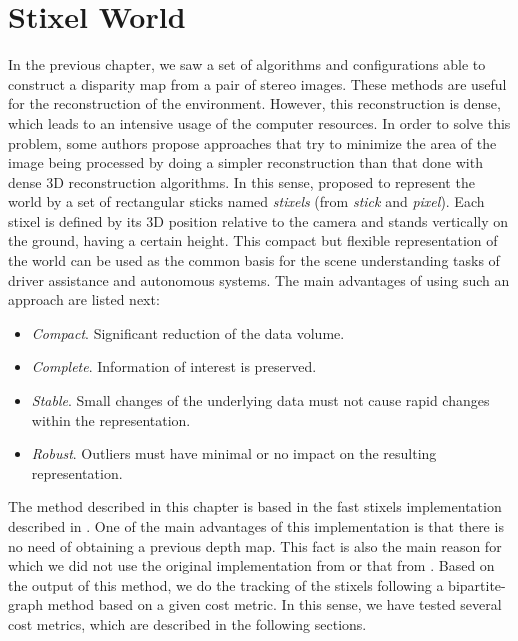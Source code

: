\graphicspath{{./images/chapter04/bmps/}{./images/chapter04/vects/}{./images/chapter04/}}

\chapter{Stixel World}\label{ch:chapter04}

In the previous chapter, we saw a set of algorithms and configurations able to construct a disparity map from a pair of stereo images. These methods are useful for the reconstruction of the environment. However, this reconstruction is dense, which leads to an intensive usage of the computer resources. In order to solve this problem, some authors propose approaches that try to minimize the area of the image being processed by doing a simpler reconstruction than that done with dense 3D reconstruction algorithms. In this sense, \cite{badino2009stixel} proposed to represent the world by a set of rectangular sticks named \emph{stixels} (from \emph{stick} and \emph{pixel}). Each stixel is defined by its 3D position relative to the camera and stands vertically on the ground, having a certain height.
This compact but flexible representation of the world can be used as the common basis for the scene understanding tasks of driver assistance and autonomous systems. The main advantages of using such an approach are listed next:
\begin{itemize}
 \item \emph{Compact}. Significant reduction of the data volume.
 \item \emph{Complete}. Information of interest is preserved.
 \item \emph{Stable}. Small changes of the underlying data must not cause rapid changes within the representation.
 \item \emph{Robust}. Outliers must have minimal or no impact on the resulting representation.
\end{itemize}

The method described in this chapter is based in the fast stixels implementation described in \cite{benenson2012pedestrian}. One of the main advantages of this implementation is that there is no need of obtaining a previous depth map. This fact is also the main reason for which we did not use the original implementation from \cite{badino2009stixel} or that from \cite{pfeiffer2010efficient}. Based on the output of this method, we do the tracking of the stixels following a bipartite-graph method based on a given cost metric. In this sense, we have tested several cost metrics, which are described in the following sections.

